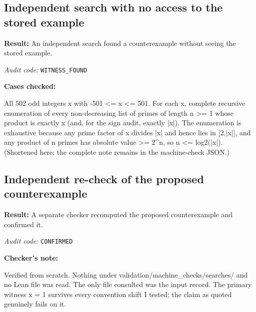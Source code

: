 \documentclass[11pt]{article}
\begin{document}
\subsection*{Independent search with no access to the stored example}
\textbf{Result:} An independent search found a counterexample without seeing the stored example.
\par\textit{Audit code:} \nolinkurl{WITNESS_FOUND}
\par\textbf{Cases checked:}
\begin{Vsrc}
All 502 odd integers x with -501 <= x <= 501. For each x, complete recursive enumeration of every non-decreasing list of primes of length n >= 1 whose product is exactly x (and, for the sign audit, exactly |x|). The enumeration is exhaustive because any prime factor of x divides |x| and hence lies in [2,|x|], and any product of n primes has absolute value >= 2^n, so n <= log2(|x|). (Shortened here; the complete note remains in the machine-check JSON.)
\end{Vsrc}
\subsection*{Independent re-check of the proposed counterexample}
\textbf{Result:} A separate checker recomputed the proposed counterexample and confirmed it.
\par\textit{Audit code:} \nolinkurl{CONFIRMED}
\par\textbf{Checker's note:}
\begin{Vsrc}
Verified from scratch. Nothing under validation/machine_checks/searches/ and no Lean file was read. The only file consulted was the input record. The primary witness x = 1 survives every convention shift I tested; the claim as quoted genuinely fails on it.
\end{Vsrc}
\end{document}
